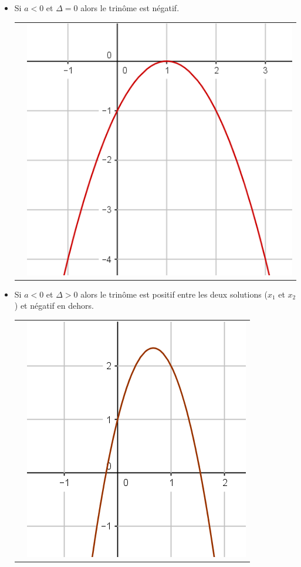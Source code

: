 \documentclass[12pt,a4paper]{article}
\begin{document}
\begin{itemize}
				\item 
				Si $a < 0$ et $\Delta = 0$ alors le trinôme est négatif.
				
				\begin{tabular}{ll }
					 &
					
					\includegraphics[scale=0.35]{./img/fig_2}\\
				\end{tabular}
				
				\item 
				Si $a < 0$ et $\Delta > 0$ alors le trinôme est positif entre les deux solutions ($x_1$ et $x_2$) et négatif en dehors.
				
				\begin{tabular}{ll }
					 &
					
					\includegraphics[scale=0.35]{./img/fig_4}\\
				\end{tabular}
			
		\end{itemize}
	
\end{document}
